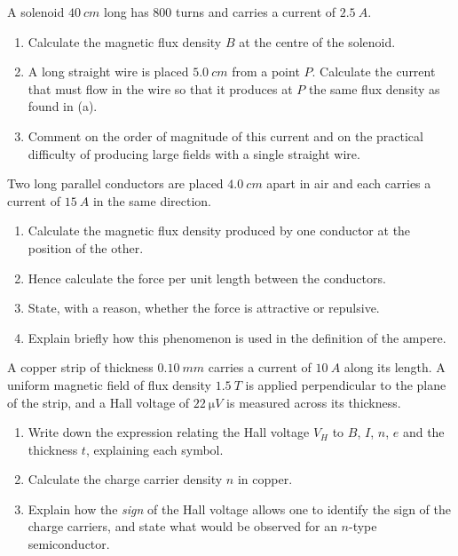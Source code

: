 \documentclass[11pt]{article}
\newcommand{\cle}[1]{{\popxbold\color{popdark}#1}}
\begin{document}
\begin{exercice}
A solenoid $\SI{40}{cm}$ long has $800$ turns and carries a current of $\SI{2.5}{A}$.
\begin{enumerate}
\item Calculate the magnetic flux density $B$ at the centre of the solenoid.
\item A long straight wire is placed $\SI{5.0}{cm}$ from a point $P$. Calculate the current that must flow in the wire so that it produces at $P$ the same flux density as found in (a).
\item Comment on the order of magnitude of this current and on the practical difficulty of producing large fields with a single straight wire.
\end{enumerate}
\end{exercice}

\begin{exercice}
Two long parallel conductors are placed $\SI{4.0}{cm}$ apart in air and each carries a current of $\SI{15}{A}$ in the same direction.
\begin{enumerate}
\item Calculate the magnetic flux density produced by one conductor at the position of the other.
\item Hence calculate the force per unit length between the conductors.
\item State, with a reason, whether the force is attractive or repulsive.
\item Explain briefly how this phenomenon is used in the definition of the \cle{ampere}.
\end{enumerate}
\end{exercice}

\begin{exercice}
A copper strip of thickness $\SI{0.10}{mm}$ carries a current of $\SI{10}{A}$ along its length. A uniform magnetic field of flux density $\SI{1.5}{T}$ is applied perpendicular to the plane of the strip, and a Hall voltage of $\SI{22}{\micro V}$ is measured across its thickness.
\begin{enumerate}
\item Write down the expression relating the Hall voltage $V_H$ to $B$, $I$, $n$, $e$ and the thickness $t$, explaining each symbol.
\item Calculate the charge carrier density $n$ in copper.
\item Explain how the \emph{sign} of the Hall voltage allows one to identify the sign of the charge carriers, and state what would be observed for an $n$-type semiconductor.
\end{enumerate}
\end{exercice}
\end{document}

